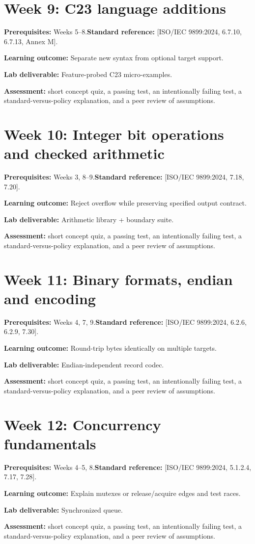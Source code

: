 \documentclass[10pt,letterpaper,oneside]{report}
\newcommand{\refcl}[1]{\textsf{\footnotesize[ISO/IEC 9899:2024, #1]}}
\begin{document}
\section{Week 9: C23 language additions}
\textbf{Prerequisites:} Weeks 5--8.\quad \textbf{Standard reference:} \refcl{6.7.10, 6.7.13, Annex M}.\par\textbf{Learning outcome:} Separate new syntax from optional target support.\par\textbf{Lab deliverable:} Feature-probed C23 micro-examples.\par\textbf{Assessment:} short concept quiz, a passing test, an intentionally failing test, a standard-versus-policy explanation, and a peer review of assumptions.

\section{Week 10: Integer bit operations and checked arithmetic}
\textbf{Prerequisites:} Weeks 3, 8--9.\quad \textbf{Standard reference:} \refcl{7.18, 7.20}.\par\textbf{Learning outcome:} Reject overflow while preserving specified output contract.\par\textbf{Lab deliverable:} Arithmetic library + boundary suite.\par\textbf{Assessment:} short concept quiz, a passing test, an intentionally failing test, a standard-versus-policy explanation, and a peer review of assumptions.

\section{Week 11: Binary formats, endian and encoding}
\textbf{Prerequisites:} Weeks 4, 7, 9.\quad \textbf{Standard reference:} \refcl{6.2.6, 6.2.9, 7.30}.\par\textbf{Learning outcome:} Round-trip bytes identically on multiple targets.\par\textbf{Lab deliverable:} Endian-independent record codec.\par\textbf{Assessment:} short concept quiz, a passing test, an intentionally failing test, a standard-versus-policy explanation, and a peer review of assumptions.

\section{Week 12: Concurrency fundamentals}
\textbf{Prerequisites:} Weeks 4--5, 8.\quad \textbf{Standard reference:} \refcl{5.1.2.4, 7.17, 7.28}.\par\textbf{Learning outcome:} Explain mutexes or release/acquire edges and test races.\par\textbf{Lab deliverable:} Synchronized queue.\par\textbf{Assessment:} short concept quiz, a passing test, an intentionally failing test, a standard-versus-policy explanation, and a peer review of assumptions.
\end{document}
